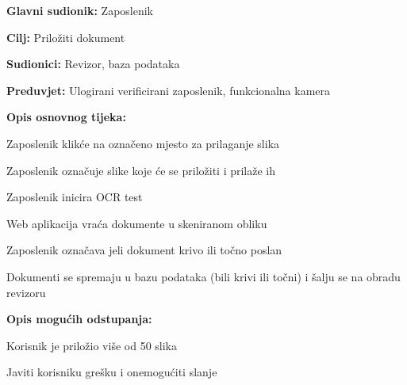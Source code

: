 					\noindent {}
					\begin{packed_item}
	
						\item \textbf{Glavni sudionik:} Zaposlenik
						\item  \textbf{Cilj:} Priložiti dokument
						\item  \textbf{Sudionici:} Revizor, baza podataka
						\item  \textbf{Preduvjet:} Ulogirani verificirani zaposlenik, funkcionalna kamera
						\item  \textbf{Opis osnovnog tijeka:}
						
						\item[] \begin{packed_enum}
	
							\item Zaposlenik klikće na označeno mjesto za prilaganje slika
							\item Zaposlenik označuje slike koje će se priložiti i prilaže ih
							\item Zaposlenik inicira OCR test
							\item Web aplikacija vraća dokumente u skeniranom obliku
							\item Zaposlenik označava jeli dokument krivo ili točno poslan
							\item Dokumenti se spremaju u bazu podataka (bili krivi ili točni) i šalju se na obradu revizoru
						\end{packed_enum}
						
						\item  \textbf{Opis mogućih odstupanja:}
						
						\item[] \begin{packed_item}
	
							\item[2.a] Korisnik je priložio više od 50 slika
							\item[] \begin{packed_enum}
								
								\item Javiti korisniku grešku i onemogućiti slanje
								
							\end{packed_enum}
							
						\end{packed_item}
					\end{packed_item}
				
